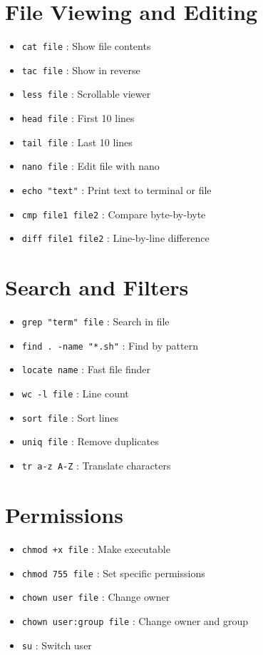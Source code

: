 \documentclass[12pt]{article}
\begin{document}
\begin{multicols}{2}
\section*{File Viewing and Editing}
\begin{itemize}[leftmargin=0.5cm]
  \item \texttt{cat file} : Show file contents
  \item \texttt{tac file} : Show in reverse
  \item \texttt{less file} : Scrollable viewer
  \item \texttt{head file} : First 10 lines
  \item \texttt{tail file} : Last 10 lines
  \item \texttt{nano file} : Edit file with nano
  \item \texttt{echo "text"} : Print text to terminal or file
  \item \texttt{cmp file1 file2} : Compare byte-by-byte
  \item \texttt{diff file1 file2} : Line-by-line difference
\end{itemize}

\section*{Search and Filters}
\begin{itemize}[leftmargin=0.5cm]
  \item \texttt{grep "term" file} : Search in file
  \item \texttt{find . -name "*.sh"} : Find by pattern
  \item \texttt{locate name} : Fast file finder
  \item \texttt{wc -l file} : Line count
  \item \texttt{sort file} : Sort lines
  \item \texttt{uniq file} : Remove duplicates
  \item \texttt{tr a-z A-Z} : Translate characters
\end{itemize}

\section*{Permissions}
\begin{itemize}[leftmargin=0.5cm]
  \item \texttt{chmod +x file} : Make executable
  \item \texttt{chmod 755 file} : Set specific permissions
  \item \texttt{chown user file} : Change owner
  \item \texttt{chown user:group file} : Change owner and group
  \item \texttt{su} : Switch user
\end{itemize}


\end{multicols}
\end{document}
